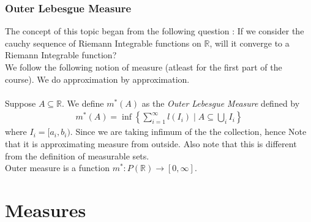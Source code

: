 \documentclass{article}
\theoremstyle{definition}
\theoremstyle{remark}
\theoremstyle{definition}
\theoremstyle{definition}
\theoremstyle{definition}
\newcommand{\bunion}{\bigcup}
\newcommand{\where}{\;\vert\;}
\newcommand{\R}{\mathbb{R}}
\begin{document}
\subsubsection{Outer Lebesgue Measure}
The concept of this topic began from the following question : If we consider the cauchy sequence of Riemann Integrable functions on $ \R $, will it converge to a Riemann Integrable function?\\
We follow the following notion of measure (atleast for the first part of the course). We do approximation by approximation.\\\\
Suppose $ A\subseteq \R $. We define $ m^*(A) $ as the \emph{Outer Lebesgue Measure} defined by
\begin{equation*}
	\begin{split}
		m^*(A) = \inf \left \{\sum_{i=1}^\infty l(I_i)\where A\subseteq \bunion_{i}I_i\right \}
	\end{split}
\end{equation*}
where $ I_i = [a_i,b_i) $. Since we are taking infimum of the the collection, hence Note that it is approximating measure from outside. Also note that this is different from the definition of measurable sets.\\
Outer measure is a function $ m^* : P(\R) \to [0,\infty] $. 
\newpage
\section{Measures}
\end{document}
